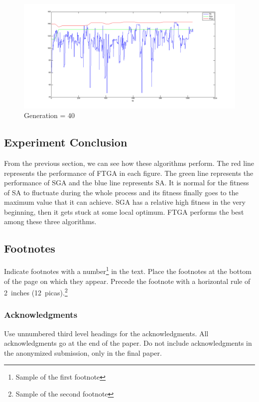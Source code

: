 \documentclass{article} %
\begin{document}
\begin{figure}[H]
\centering
\includegraphics[scale=0.3]{images/FTGA/exp1/40.png}
\caption{Generation = 40}
\end{figure}

\subsection{Experiment Conclusion}
From the previous section, we can see how these algorithms perform. The red line represents the performance of FTGA in each figure. The green line represents the performance of SGA and the blue line represents SA. It is normal for the fitness of SA to fluctuate during the whole process and its fitness finally goes to the maximum value that it can achieve. SGA has a relative high fitness in the very beginning, then it gets stuck at some local optimum. FTGA performs the best among these three algorithms. 

\subsection{Footnotes}

Indicate footnotes with a number\footnote{Sample of the first footnote} in the
text. Place the footnotes at the bottom of the page on which they appear.
Precede the footnote with a horizontal rule of 2~inches
(12~picas).\footnote{Sample of the second footnote}

\subsubsection*{Acknowledgments}

Use unnumbered third level headings for the acknowledgments. All
acknowledgments go at the end of the paper. Do not include 
acknowledgments in the anonymized submission, only in the 
final paper. 
\end{document}
